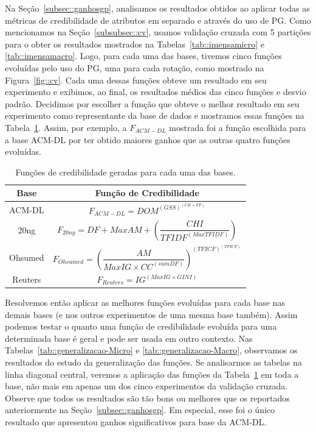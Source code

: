 Na Seção~\ref{subsec::ganhosgp}, analisamos os resultados obtidos ao aplicar todas as métricas de credibilidade de atributos em separado e através do uso de \textsc{PG}.
Como mencionamos na Seção~\ref{subsubsec::cv}, usamos validação cruzada com 5 partições para o obter os resultados mostrados na Tabelas~\ref{tab::imensamicro} e \ref{tab::imensamacro}.
Logo, para cada uma das bases, tivemos cinco funções evoluídas pelo uso do \textsc{PG}, uma para cada rotação, como mostrado na Figura~\ref{fig::cv}. 
Cada uma dessas funções obteve um resultado em seu experimento e exibimos, ao final, os resultados médios das cinco funções e desvio padrão.
Decidimos por escolher a função que obteve o melhor resultado em seu experimento como representante da base de dados e mostramos essas funções na Tabela~\ref{tab::representantes}.
Assim, por exemplo, a $F_{ACM-DL}$ mostrada foi a função escolhida para a base \textsc{ACM-DL} por ter obtido maiores ganhos que as outras quatro funções evoluídas.

\begin{table}[!h]
\renewcommand{\arraystretch}{1.3}
\centering
\caption{Funções de credibilidade geradas para cada uma das bases.}
\label{tab::representantes}
\begin{scriptsize}
\begin{tabular}{|c||c|}
\toprule
\textbf{Base} & \textbf{Função de Credibilidade}\tabularnewline
\midrule
\hline
ACM-DL   & $F_{ACM-DL} =  DOM^{(GSS)^{(CE + TF)}} $\tabularnewline
\hline 
20ng & $F_{20ng} = DF + MaxAM + (\dfrac{ CHI } { TFIDF^{(MaxTFIDF)} }) $\tabularnewline
\hline 
Ohsumed  & $ F_{Ohsumed} = (\dfrac{AM}{MaxIG \times CC^{(sumDF)}} )^{(TFICF)^{(TFICF)}} $\tabularnewline
\hline 
Reuters & $ F_{Reuters} = IG^{(MaxIG \times GINI)}$\tabularnewline
\bottomrule
\end{tabular}
\end{scriptsize}
\end{table}

Resolvemos então aplicar as melhores funções evoluídas para cada base nas demais bases (e nos outros experimentos de uma mesma base também). Assim podemos testar o quanto uma função de credibilidade evoluída para uma determinada base é geral e pode ser usada em outro contexto. Nas Tabelas~\ref{tab::generalizacao-Micro} e \ref{tab::generalizacao-Macro}, observamos os resultados do estudo da generalização das funções. Se analisarmos as tabelas na linha diagonal central, veremos a aplicação das funções da Tabela~\ref{tab::representantes} em toda a base, não mais em apenas um dos cinco experimentos da validação cruzada. Observe que todos os resultados são tão bons ou melhores que os reportados anteriormente na Seção~\ref{subsec::ganhosgp}. Em especial, esse foi o único resultado que apresentou ganhos significativos para base da \textsc{ACM-DL}.

